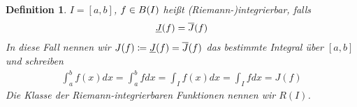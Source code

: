 \documentclass[11pt, twoside, a4paper]{article}
\theoremstyle{plain}
\newtheorem{definition}[blockelement]{Definition}
\newcommand{\of}[1]{\mathopen{}\mathclose{}\bgroup\left(#1\aftergroup\egroup\right)}
\newcommand{\interv}[1]{\left[#1\right]}
\newcommand{\definedas}[0]{\coloneqq}
\begin{document}
    \begin{definition}
        $I=\interv{a,b}$, $f\in B\of{I}$ heißt (Riemann-)integrierbar, falls
        \begin{align*}
            \underline{J}\of{f} = \overline{J}\of{f}
        \end{align*}
        In diese Fall nennen wir $J(f) \definedas \underline{J}\of{f} = \overline{J}\of{f}$ das bestimmte Integral über $\interv{a,b}$ und schreiben
        \begin{align*}
            \int_{a}^{b} f(x) dx = \int_{a}^{b} fdx = \int_{I} f(x)dx = \int_{I} fdx = J(f)
        \end{align*}
        Die Klasse der Riemann-integrierbaren Funktionen nennen wir $R(I)$.
    \end{definition}
\end{document}
